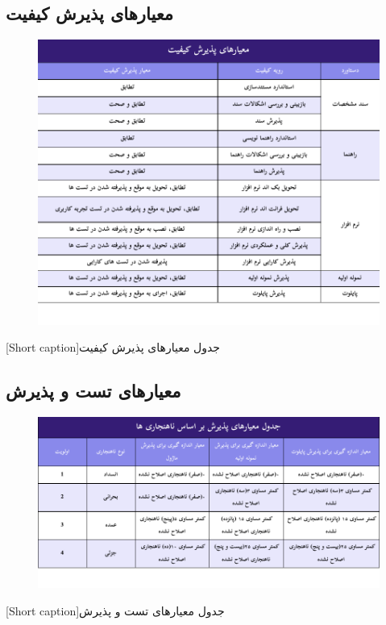 \subsection{
معیار‌های پذیرش کیفیت
}
\begin{center}
  \begin{figure} [H]
    { \includegraphics[width=\textwidth , scale=0.8]{appandecies/quality_acceptance_criteria_2.pdf}}
  \end{figure}
  [Short caption]{جدول معیار‌های پذیرش کیفیت}
\end{center}

\subsection{
معیار‌های تست و پذیرش
}
\begin{center}
  \begin{figure} [H]
    { \includegraphics[width=\textwidth , scale=1.5]{appandecies/quality_acceptance_criteria_3.pdf}}
  \end{figure}
  [Short caption]{جدول معیار‌های تست و پذیرش}
\end{center}